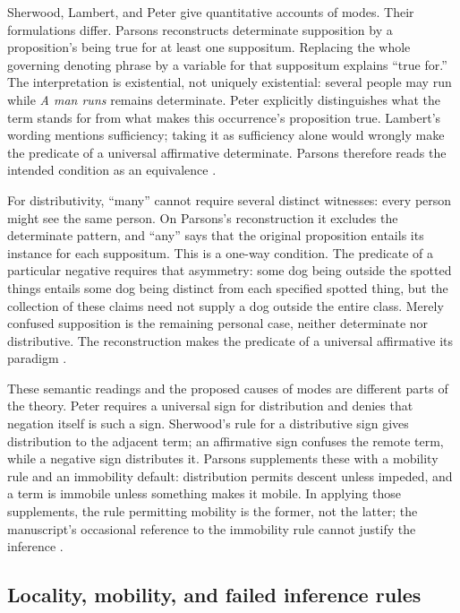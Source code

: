 Sherwood, Lambert, and Peter give quantitative accounts of modes. Their
formulations differ. Parsons reconstructs determinate supposition
by a proposition's being true for at least one suppositum. Replacing the
whole governing denoting phrase by a variable for that suppositum
explains ``true for.'' The interpretation is existential, not uniquely
existential: several people may run while \emph{A man runs} remains
determinate. Peter explicitly distinguishes what the term stands for
from what makes this occurrence's proposition true. Lambert's wording
mentions sufficiency; taking it as sufficiency alone would wrongly make
the predicate of a universal affirmative determinate. Parsons therefore
reads the intended condition as an equivalence
\cite[pp.~225--227]{Parsons2007FordhamSupposition}.

For distributivity, ``many'' cannot require several distinct witnesses:
every person might see the same person. On Parsons's reconstruction it
excludes the determinate pattern, and ``any'' says that the original
proposition entails its instance for each suppositum. This is a
one-way condition. The predicate of a particular negative requires that
asymmetry: some dog being outside the spotted things entails some dog
being distinct from each specified spotted thing, but the collection
of these claims need not supply a dog outside the entire class. Merely
confused supposition is the remaining personal case, neither
determinate nor distributive. The reconstruction makes the predicate
of a universal affirmative its paradigm
\cite[pp.~227--230]{Parsons2007FordhamSupposition}.

These semantic readings and the proposed causes of modes are different
parts of the theory. Peter requires a universal sign for distribution
and denies that negation itself is such a sign. Sherwood's rule for a
distributive sign gives distribution to the adjacent term; an
affirmative sign confuses the remote term, while a negative sign
distributes it. Parsons supplements these with a mobility rule and an
immobility default: distribution permits descent unless impeded, and
a term is immobile unless something makes it mobile. In applying those
supplements, the rule permitting mobility is the former, not the latter;
the manuscript's occasional reference to the immobility rule cannot
justify the inference
\cite[pp.~229,233--236]{Parsons2007FordhamSupposition}.

\subsection{Locality, mobility, and failed inference rules}
\label{sec:p13-supposition-early-rules}

